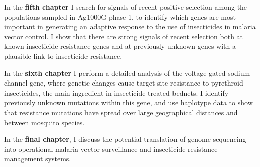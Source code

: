 In the \textbf{fifth chapter} I search for signals of recent positive selection among the populations sampled in Ag1000G phase 1, to identify which genes are most important in generating an adaptive response to the use of insecticides in malaria vector control.
%
I show that there are strong signals of recent selection both at known insecticide resistance genes and at previously unknown genes with a plausible link to insecticide resistance.


In the \textbf{sixth chapter} I perform a detailed analysis of the voltage-gated sodium channel gene, where genetic changes cause target-site resistance to pyrethroid insecticides, the main ingredient in insecticide-treated bednets.
%
I identify previously unknown mutations within this gene, and use haplotype data to show that resistance mutations have spread over large geographical distances and between mosquito species.


In the \textbf{final chapter}, I discuss the potential translation of genome sequencing into operational malaria vector surveillance and insecticide resistance management systems.
